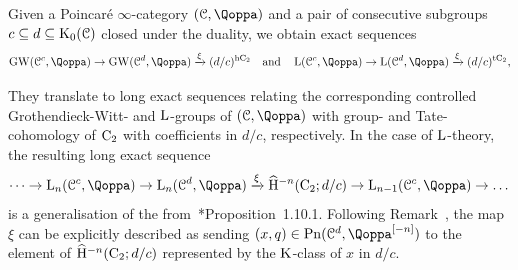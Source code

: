 \begin{corollary}
\label{cor:rothenbergconc}%
Given a Poincaré $\infty$-category $(\C,\QF)$ and a pair of consecutive subgroups $c \subseteq d \subseteq \operatorname K_0(\mathcal C)$ closed under the duality, we obtain exact sequences
\[
\GW(\C^c,\QF)\to \GW(\C^d,\QF)\xrightarrow{\xi} (d/c)^\hC \quad\text{and}\quad \L(\C^c,\QF)\to \L(\C^d,\QF)\xrightarrow{\xi} (d/c)^\tC,
\]
\end{corollary}
They translate to long exact sequences relating the corresponding controlled Grothendieck-Witt- and $\operatorname L$-groups of $(\C,\QF)$ with group- and Tate-cohomology of $\mathrm{C_2}$ with coefficients in $d/c$, respectively. 
In the case of $\operatorname L$-theory, the resulting long exact sequence 
\begin{equation}
\label{equation:rothenberg}%
\dots \to \L_n(\C^c, \QF) \to \L_n(\C^d, \QF) \xrightarrow\xi \widehat{\mathrm{H}}^{-n}(\Ct; d/c) \to \L_{n-1}(\C^c, \QF) \to \dots
\end{equation}
is a generalisation of the  from~\cite{Ranickiyellowbook}*{Proposition~1.10.1}. Following Remark~, the map $\xi$ can be explicitly described as sending $(x,q)\in \Poinc(\C^d, \QF\qshift{-n})$ to the element of $\widehat{\mathrm{H}}^{-n}(\mathrm{C_2}; d/c)$ represented by the $\operatorname K$-class of $x$ in $d/c$. 



